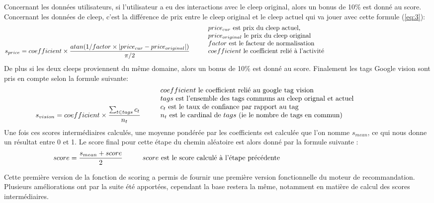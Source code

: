 \documentclass{article} %
\begin{document}
Concernant les données utilisateurs, si l'utilisateur a eu des interactions avec le cleep original, alors un bonus de 10\% est donné au score.\\

Concernant les données de cleep, c'est la différence de prix entre le cleep original et le cleep actuel qui va jouer avec cette formule (\ref{eq:3}):
\begin{equation}
\label{eq:3}
s_{price} = coefficient\times\frac{atan(1/factor \times |price_{cur} - price_{original}| )}{\pi/2} \hspace{1cm} \mbox{\vbox{\noindent $price_{cur}$ est prix du cleep actuel,\\ $price_{original}$ le prix du cleep original \\ $factor$ est le facteur de normalisation \\ $coefficient$ le coefficient relié à l'activité}}
\end{equation}
De plus si les deux cleeps proviennent du même domaine, alors un bonus de 10\% est donné au score. Finalement les tags Google vision sont pris en compte selon la formule suivante:
\begin{equation}
\label{eq:4}
s_{vision} = coefficient\times \frac{\sum_{t \in tags}c_{t}}{n_{t}}
\hspace{1cm} \mbox{\vbox{\noindent $coefficient$ le coefficient relié au google tag vision\\
$tags$ est l'ensemble des tags communs au cleep orignal et actuel\\
$c_{t}$ est le taux de confiance par rapport au tag\\
$n_{t}$ est le cardinal de $tags$ (ie le nombre de tags en commun)}}
\end{equation}
\newpage
Une fois ces scores intermédiaires calculés, une moyenne pondérée par les coefficients est calculée que l'on nomme $s_{mean}$, ce qui nous donne un résultat entre 0 et 1. Le score final pour cette étape du chemin aléatoire est alors donné par la formule suivante :
\begin{equation}
\label{eq:4}
score = \frac{s_{mean} + score}{2}
\hspace{1cm} \mbox{\vbox{\noindent $score$ est le score calculé à l'étape précédente}}
\end{equation}

Cette première version de la fonction de scoring a permis de fournir une première version fonctionnelle du moteur de recommandation. Plusieurs améliorations ont par la suite été apportées, cependant la base restera la même, notamment en matière de calcul des scores intermédiaires.
\end{document}
